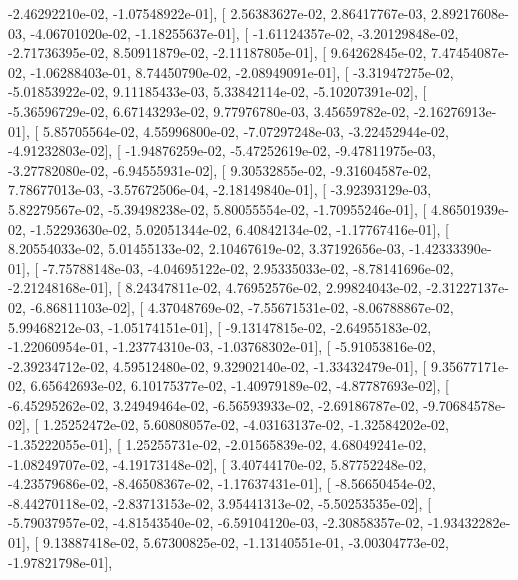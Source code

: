 \documentclass{article}
\begin{document}
         -2.46292210e-02,  -1.07548922e-01],
       [  2.56383627e-02,   2.86417767e-03,   2.89217608e-03,
         -4.06701020e-02,  -1.18255637e-01],
       [ -1.61124357e-02,  -3.20129848e-02,  -2.71736395e-02,
          8.50911879e-02,  -2.11187805e-01],
       [  9.64262845e-02,   7.47454087e-02,  -1.06288403e-01,
          8.74450790e-02,  -2.08949091e-01],
       [ -3.31947275e-02,  -5.01853922e-02,   9.11185433e-03,
          5.33842114e-02,  -5.10207391e-02],
       [ -5.36596729e-02,   6.67143293e-02,   9.77976780e-03,
          3.45659782e-02,  -2.16276913e-01],
       [  5.85705564e-02,   4.55996800e-02,  -7.07297248e-03,
         -3.22452944e-02,  -4.91232803e-02],
       [ -1.94876259e-02,  -5.47252619e-02,  -9.47811975e-03,
         -3.27782080e-02,  -6.94555931e-02],
       [  9.30532855e-02,  -9.31604587e-02,   7.78677013e-03,
         -3.57672506e-04,  -2.18149840e-01],
       [ -3.92393129e-03,   5.82279567e-02,  -5.39498238e-02,
          5.80055554e-02,  -1.70955246e-01],
       [  4.86501939e-02,  -1.52293630e-02,   5.02051344e-02,
          6.40842134e-02,  -1.17767416e-01],
       [  8.20554033e-02,   5.01455133e-02,   2.10467619e-02,
          3.37192656e-03,  -1.42333390e-01],
       [ -7.75788148e-03,  -4.04695122e-02,   2.95335033e-02,
         -8.78141696e-02,  -2.21248168e-01],
       [  8.24347811e-02,   4.76952576e-02,   2.99824043e-02,
         -2.31227137e-02,  -6.86811103e-02],
       [  4.37048769e-02,  -7.55671531e-02,  -8.06788867e-02,
          5.99468212e-03,  -1.05174151e-01],
       [ -9.13147815e-02,  -2.64955183e-02,  -1.22060954e-01,
         -1.23774310e-03,  -1.03768302e-01],
       [ -5.91053816e-02,  -2.39234712e-02,   4.59512480e-02,
          9.32902140e-02,  -1.33432479e-01],
       [  9.35677171e-02,   6.65642693e-02,   6.10175377e-02,
         -1.40979189e-02,  -4.87787693e-02],
       [ -6.45295262e-02,   3.24949464e-02,  -6.56593933e-02,
         -2.69186787e-02,  -9.70684578e-02],
       [  1.25252472e-02,   5.60808057e-02,  -4.03163137e-02,
         -1.32584202e-02,  -1.35222055e-01],
       [  1.25255731e-02,  -2.01565839e-02,   4.68049241e-02,
         -1.08249707e-02,  -4.19173148e-02],
       [  3.40744170e-02,   5.87752248e-02,  -4.23579686e-02,
         -8.46508367e-02,  -1.17637431e-01],
       [ -8.56650454e-02,  -8.44270118e-02,  -2.83713153e-02,
          3.95441313e-02,  -5.50253535e-02],
       [ -5.79037957e-02,  -4.81543540e-02,  -6.59104120e-03,
         -2.30858357e-02,  -1.93432282e-01],
       [  9.13887418e-02,   5.67300825e-02,  -1.13140551e-01,
         -3.00304773e-02,  -1.97821798e-01],
\end{document}
